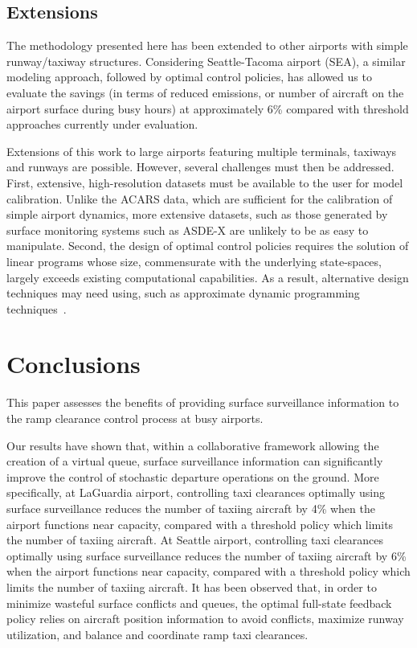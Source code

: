 \documentclass[letterpaper]{article}
\begin{document}
\subsection{Extensions}
The methodology presented here has been extended to other airports with simple runway/taxiway structures. Considering Seattle-Tacoma airport (SEA),
a similar modeling approach, followed by optimal control policies, has allowed us to evaluate the savings (in terms of reduced emissions, or number of aircraft on the airport surface during busy hours) at approximately 6\% compared with threshold approaches currently under evaluation. 

Extensions of this work to large airports featuring multiple terminals, taxiways and runways are possible. However, several challenges must then be addressed. First, extensive, high-resolution datasets must be available to the user for model calibration. Unlike the ACARS data, which are sufficient for the calibration of simple airport dynamics, more extensive datasets, such as those generated by surface monitoring systems such as ASDE-X are unlikely to be as easy to manipulate. Second, the design of optimal control policies requires the solution of linear programs whose size, commensurate with the underlying state-spaces, largely exceeds existing computational capabilities. As a result, alternative design techniques may need using, such as approximate dynamic programming techniques~\cite{BeT:96}. 

\section{Conclusions}
This paper assesses the benefits of providing surface surveillance information to the ramp clearance control
process at busy airports.

Our results have shown that, within a collaborative framework allowing the creation of a virtual queue, surface surveillance information can significantly improve the control of stochastic 
departure operations on the ground. More specifically, at LaGuardia airport, controlling taxi clearances optimally using surface surveillance reduces
 the number of taxiing aircraft by 4\% when the airport functions near capacity, compared with a threshold policy which limits the number of taxiing 
 aircraft. At Seattle airport, controlling taxi clearances optimally using surface surveillance reduces the number
of taxiing aircraft by 6\% when the airport functions near capacity, compared with a threshold policy which limits the number of taxiing aircraft.
It has been observed that, in order to minimize wasteful surface conflicts and queues, the optimal full-state feedback policy relies on aircraft position information to avoid conflicts, maximize runway utilization, and balance and coordinate ramp taxi clearances. 
\end{document}
